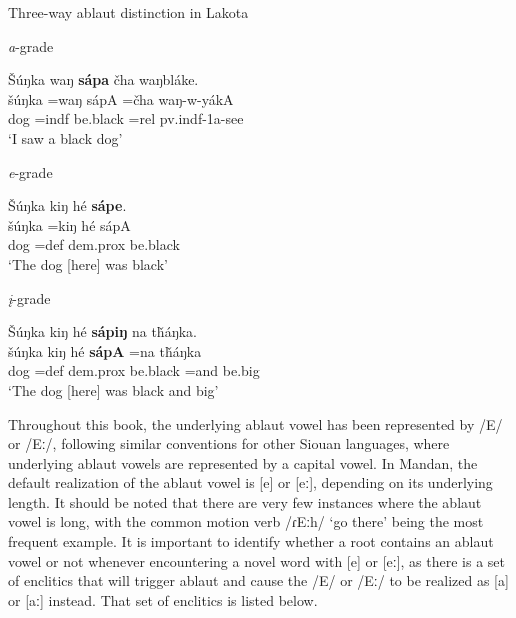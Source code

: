 \begin{exe}
\item\label{lakotaablaut} Three-way ablaut distinction in Lakota \citep[754]{ullrich2011}

	\begin{xlist}

	\item\label{lakotaablaut1} \textit{a}-grade

	\glll	Šúŋka waŋ \textbf{sápa} čha waŋbláke.\\
	šúŋka =waŋ sápA =čha waŋ-w-yákA\\
	\textnormal{dog} =indf \textnormal{be.black} =rel pv.indf-1a-\textnormal{see}\\
	\glt `I saw a black dog'

	\item\label{lakotaablaut2} \textit{e}-grade

	\glll Šúŋka kiŋ hé \textbf{sápe}.\\
	šúŋka =kiŋ hé sápA\\
	\textnormal{dog} =def dem.prox \textnormal{be.black}\\
	\glt `The dog [here] was black'

	\item\label{lakotaablaut3} \textit{į}-grade

	\glll Šúŋka kiŋ hé \textbf{sápiŋ} na tȟáŋka.\\
	šúŋka kiŋ hé \textbf{sápA} =na tȟáŋka\\
	\textnormal{dog} =def dem.prox \textnormal{be.black} =\textnormal{and} \textnormal{be.big}\\
	\glt `The dog [here] was black and big'

	\end{xlist}

\end{exe}

Throughout this book, the underlying ablaut vowel has been represented by /E/ or /Eː/, following similar conventions for other Siouan languages, where underlying ablaut vowels are represented by a capital vowel. In Mandan, the default realization of the ablaut vowel is [e] or [eː], depending on its underlying length. It should be noted that there are very few instances where the ablaut vowel is long, with the common motion verb /ɾEːh/ `go there' being the most frequent example. It is important to identify whether a root contains an ablaut vowel or not whenever encountering a novel word with [e] or [eː], as there is a set of enclitics that will trigger ablaut and cause the /E/ or /Eː/ to be realized as [a] or [aː] instead. That set of enclitics is listed below.

